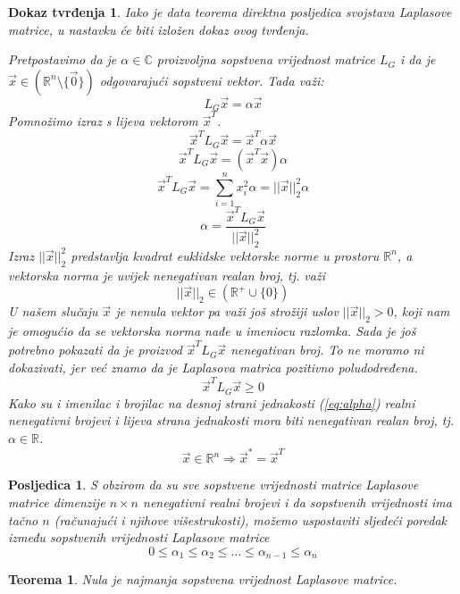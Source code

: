 \documentclass[11pt]{article}
\newtheorem{theorem}{Teorema}
\newtheorem*{custom_proof}{Dokaz tvrđenja}
\newtheorem{consequence}{Posljedica}
\begin{document}
	\begin{custom_proof}
	Iako je data teorema direktna posljedica svojstava Laplasove matrice, u nastavku će biti izložen dokaz ovog tvrđenja.
	
	Pretpostavimo da je $\alpha \in \mathbb{C}$ proizvoljna sopstvena vrijednost matrice $L_G$ i da je $\vec{x} \in (\mathbb{R}^n \setminus \{\vec{0}\})$ odgovarajući sopstveni vektor. Tada važi:
	\[
		L_G\vec{x} = \alpha \vec{x}
	\]
	Pomnožimo izraz s lijeva vektorom $\vec{x}^T$.
	\[
		\vec{x}^TL_G\vec{x} = \vec{x}^T\alpha \vec{x}
	\]
	\[
		\vec{x}^TL_G\vec{x} = (\vec{x}^T \vec{x}) \alpha
	\]
	\[
		\vec{x}^TL_G\vec{x} =  \sum_{i=1}^{n}x_i^2 \alpha= ||\vec{x}||_2^2 \alpha  
	\]
	\begin{equation}
		 \alpha =   \frac{\vec{x}^TL_G\vec{x}}{||\vec{x}||_2^2}
	\label{eq:alpha}
	\end{equation}
	Izraz $||\vec{x}||_2^2$ predstavlja kvadrat euklidske vektorske norme u prostoru $\mathbb{R}^n$, a vektorska norma je uvijek nenegativan realan broj, tj. važi
	\[
		||\vec{x}||_2 \in (\mathbb{R}^+ \cup \{0\})  
	\]
	U našem slučaju $\vec{x}$ je nenula vektor pa važi još strožiji uslov $||\vec{x}||_2 > 0$, koji nam je omogućio da se vektorska norma nađe u imeniocu razlomka. Sada je još potrebno pokazati da je proizvod $\vec{x}^TL_G\vec{x}$ nenegativan broj. To ne moramo ni dokazivati, jer već znamo da je Laplasova matrica pozitivno poludodređena.
	\[
		\vec{x}^T L_G \vec{x} \geq 0
	\]
	Kako su i imenilac i brojilac na desnoj strani jednakosti (\ref{eq:alpha}) realni nenegativni brojevi i lijeva strana jednakosti mora biti nenegativan realan broj, tj. $\alpha \in \mathbb{R}$.
	\[
		\vec{x} \in \mathbb{R}^n \Rightarrow \vec{x}^* = \vec{x}^T
	\]
	\end{custom_proof}
	
	\begin{consequence}
	S obzirom da su sve sopstvene vrijednosti matrice Laplasove matrice dimenzije $n \times n$ nenegativni realni brojevi i da sopstvenih vrijednosti ima tačno $n$
	(računajući i njihove višestrukosti), možemo uspostaviti sljedeći poredak između sopstvenih vrijednosti Laplasove matrice 
	\[
	0 \leq \alpha_1 \leq \alpha_2 \leq \dots \leq \alpha_{n-1} \leq \alpha_n
	\]
	\end{consequence}
	\newpage
	
	\begin{theorem} Nula je najmanja sopstvena vrijednost Laplasove matrice.
	\end{theorem}
	
\end{document}
